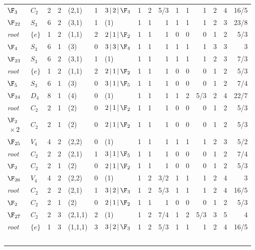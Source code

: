 \begin{landscape}
{\begin{longtable}{@{}l l r r l r l rrr rrr rrr@{}}
\quad$\F_{3}$ & $C_{2}$ & 2 & 2 & (2,1) & 1 & $3\,|\,2\,|\,\F_{3}$ & 1 & 2 & 5/3 & 1 & 1 & 1 & 2 & 4 & 16/5 \\
\addlinespace[3pt]
\textbf{$\F_{22}$} & $S_{3}$ & 6 & 2 & (3,1) & 1 & (1) & 1 & 1 & 1 & 1 & 1 & 1 & 2 & 3 & 23/8 \\
\quad\textit{root} & $\{e\}$ & 1 & 2 & (1,1) & 2 & $2\,|\,1\,|\,\F_{2}$ & 1 & 1 & 1 & 0 & 0 & 0 & 1 & 2 & 5/3 \\
\quad$\F_{4}$ & $S_{3}$ & 6 & 1 & (3) & 0 & $3\,|\,3\,|\,\F_{4}$ & 1 & 1 & 1 & 1 & 1 & 1 & 3 & 3 & 3 \\
\addlinespace[3pt]
\textbf{$\F_{23}$} & $S_{3}$ & 6 & 2 & (3,1) & 1 & (1) & 1 & 1 & 1 & 1 & 1 & 1 & 2 & 3 & 7/3 \\
\quad\textit{root} & $\{e\}$ & 1 & 2 & (1,1) & 2 & $2\,|\,1\,|\,\F_{2}$ & 1 & 1 & 1 & 0 & 0 & 0 & 1 & 2 & 5/3 \\
\quad$\F_{5}$ & $S_{3}$ & 6 & 1 & (3) & 0 & $3\,|\,1\,|\,\F_{5}$ & 1 & 1 & 1 & 0 & 0 & 0 & 1 & 2 & 7/4 \\
\addlinespace[3pt]
\textbf{$\F_{24}$} & $D_{4}$ & 8 & 1 & (4) & 0 & (1) & 1 & 1 & 1 & 1 & 2 & 5/3 & 2 & 4 & 22/7 \\
\quad\textit{root} & $C_{2}$ & 2 & 1 & (2) & 0 & $2\,|\,1\,|\,\F_{2}$ & 1 & 1 & 1 & 0 & 0 & 0 & 1 & 2 & 5/3 \\
\quad$\F_{2}$$\,{\times}2$ & $C_{2}$ & 2 & 1 & (2) & 0 & $2\,|\,1\,|\,\F_{2}$ & 1 & 1 & 1 & 0 & 0 & 0 & 1 & 2 & 5/3 \\
\addlinespace[3pt]
\textbf{$\F_{25}$} & $V_{4}$ & 4 & 2 & (2,2) & 0 & (1) & 1 & 1 & 1 & 1 & 1 & 1 & 2 & 3 & 5/2 \\
\quad\textit{root} & $C_{2}$ & 2 & 2 & (2,1) & 1 & $3\,|\,1\,|\,\F_{5}$ & 1 & 1 & 1 & 0 & 0 & 0 & 1 & 2 & 7/4 \\
\quad$\F_{2}$ & $C_{2}$ & 2 & 1 & (2) & 0 & $2\,|\,1\,|\,\F_{2}$ & 1 & 1 & 1 & 0 & 0 & 0 & 1 & 2 & 5/3 \\
\addlinespace[3pt]
\textbf{$\F_{26}$} & $V_{4}$ & 4 & 2 & (2,2) & 0 & (1) & 1 & 2 & 3/2 & 1 & 1 & 1 & 2 & 4 & 3 \\
\quad\textit{root} & $C_{2}$ & 2 & 2 & (2,1) & 1 & $3\,|\,2\,|\,\F_{3}$ & 1 & 2 & 5/3 & 1 & 1 & 1 & 2 & 4 & 16/5 \\
\quad$\F_{2}$ & $C_{2}$ & 2 & 1 & (2) & 0 & $2\,|\,1\,|\,\F_{2}$ & 1 & 1 & 1 & 0 & 0 & 0 & 1 & 2 & 5/3 \\
\addlinespace[3pt]
\textbf{$\F_{27}$} & $C_{2}$ & 2 & 3 & (2,1,1) & 2 & (1) & 1 & 2 & 7/4 & 1 & 2 & 5/3 & 3 & 5 & 4 \\
\quad\textit{root} & $\{e\}$ & 1 & 3 & (1,1,1) & 3 & $3\,|\,2\,|\,\F_{3}$ & 1 & 2 & 5/3 & 1 & 1 & 1 & 2 & 4 & 16/5 \\
$$
\end{longtable}}
\end{landscape}
